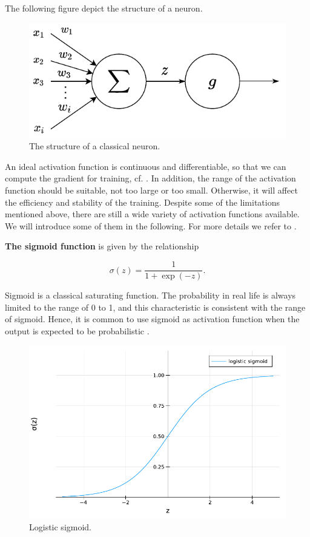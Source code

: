\documentclass[
	parskip, 			   %
	twoside, 			   %
	DIV=14, 			   %
	BCOR=15.0mm, 		   %
	headsepline, 		   %
	open=right, 		   %
	captions=tableheading, %
	bibliography=totoc,    %
	numbers=noenddot       %
]{scrreprt}
\begin{document}
The following figure depict the structure of a neuron.

\begin{figure}[h!]
    \centering
    \includegraphics[scale=1]{figures/activation_function.pdf}
    \caption{The structure of a classical neuron.}
    \label{fig:neuron_structure}
\end{figure}

An ideal activation function is continuous and differentiable, so that we can compute the gradient for training, cf. \cite{goodfellow2016deep}. In addition, the range of the activation function should be suitable, not too large or too small. Otherwise, it will affect the efficiency and stability of the training. Despite some of the limitations mentioned above, there are still a wide variety of activation functions available. We will introduce some of them in the following. For more details we refer to \cite{nwankpa2018activation}\cite{dubey2022activation}.

\textbf{The sigmoid function} is given by the relationship

\begin{equation}
    \label{eq:sigmoid}
    \sigma(z)=\frac{1}{1+\exp (-z)}.
\end{equation}

Sigmoid is a classical saturating function. The probability in real life is always limited to the range of 0 to 1, and this characteristic is consistent with the range of sigmoid. Hence, it is common to use sigmoid as activation function when the output is expected to be probabilistic \cite{nwankpa2018activation}. 

\begin{figure}[h!]
    \centering
    \includegraphics[scale=0.7]{figures/sigmoid.pdf}
    \caption{Logistic sigmoid.}
    \label{fig:sigmoid}
\end{figure}
\end{document}

